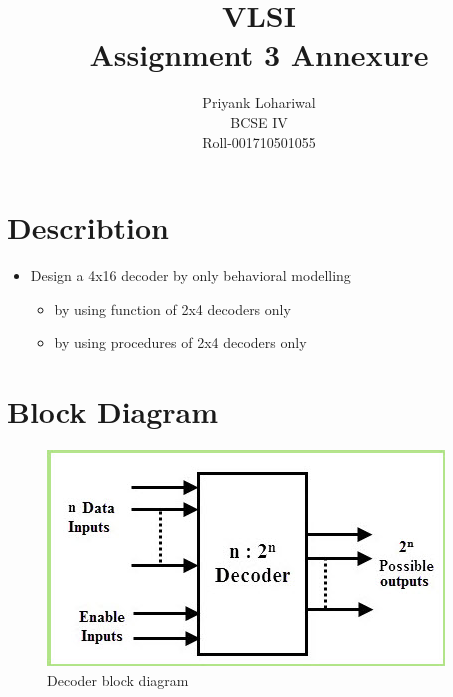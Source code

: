 \documentclass[titlepage]{article}
\title{VLSI \\Assignment 3 Annexure}
\author{Priyank Lohariwal\\BCSE IV\\Roll-001710501055}
\date{}
\begin{document}
    {\maketitle}

    \section{Describtion}
    \begin{itemize}
        \item Design a 4x16 decoder by only behavioral modelling 
        \begin{itemize}
            \item  by using function of 2x4 decoders only
            \item  by using procedures of 2x4 decoders only
        \end{itemize}
    \end{itemize}

    \section{Block Diagram} 
    \begin{figure}[!ht]
        \centering
        \includegraphics{./figures/Decoder-Block-Diagram.jpg}
        \caption{Decoder block diagram}
    \end{figure}
\end{document}
